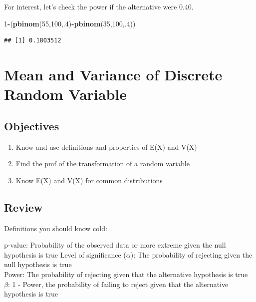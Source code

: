 \documentclass[]{book}
\newenvironment{Shaded}{\begin{snugshade}}{\end{snugshade}}
\newcommand{\KeywordTok}[1]{\textcolor[rgb]{0.13,0.29,0.53}{\textbf{#1}}}
\newcommand{\DecValTok}[1]{\textcolor[rgb]{0.00,0.00,0.81}{#1}}
\newcommand{\OperatorTok}[1]{\textcolor[rgb]{0.81,0.36,0.00}{\textbf{#1}}}
\newcommand{\NormalTok}[1]{#1}
\providecommand{\tightlist}{%
  \setlength{\itemsep}{0pt}\setlength{\parskip}{0pt}}
\theoremstyle{definition}
\theoremstyle{definition}
\theoremstyle{definition}
\theoremstyle{remark}
\begin{document}
For interest, let's check the power if the alternative were 0.40.

\begin{Shaded}
\begin{Highlighting}[]
\DecValTok{1}\OperatorTok{-}\NormalTok{(}\KeywordTok{pbinom}\NormalTok{(}\DecValTok{55}\NormalTok{,}\DecValTok{100}\NormalTok{,.}\DecValTok{4}\NormalTok{)}\OperatorTok{-}\KeywordTok{pbinom}\NormalTok{(}\DecValTok{35}\NormalTok{,}\DecValTok{100}\NormalTok{,.}\DecValTok{4}\NormalTok{))}
\end{Highlighting}
\end{Shaded}

\begin{verbatim}
## [1] 0.1803512
\end{verbatim}

\hypertarget{L9}{\section{Mean and Variance of Discrete Random
Variable}\label{L9}}

\subsection{Objectives}\label{objectives-8}

\begin{enumerate}
\def\labelenumi{\arabic{enumi}.}
\tightlist
\item
  Know and use definitions and properties of E(X) and V(X)\\
\item
  Find the pmf of the transformation of a random variable\\
\item
  Know E(X) and V(X) for common distributions
\end{enumerate}

\subsection{Review}\label{review}

Definitions you should know cold:

p-value: Probability of the observed data or more extreme given the null
hypothesis is true Level of significance (\(\alpha\)): The probability
of rejecting given the null hypothesis is true\\
Power: The probability of rejecting given that the alternative
hypothesis is true\\
\(\beta\): 1 - Power, the probability of failing to reject given that
the alternative hypothesis is true
\end{document}

